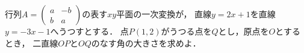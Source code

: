 \documentclass[../../main.tex]{subfiles}
\begin{document}
行列$A=
\begin{pmatrix} a & -b \\ b & a
\end{pmatrix}$の表す$xy$平面の一次変換が，
直線$y=2x+1$を直線$y=-3x-1$へうつすとする．
点$P(1,2)$がうつる点を$Q$とし，原点を$O$とするとき，
二直線$OP$と$OQ$のなす角の大きさを求めよ．
\end{document}
